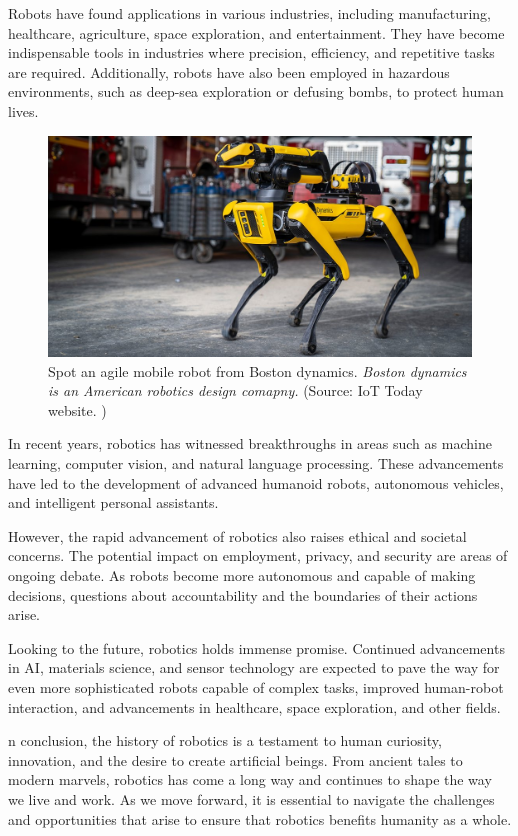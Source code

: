 Robots have found applications in various industries, including manufacturing, healthcare, agriculture, space exploration, and entertainment. They have become indispensable tools in industries where precision, efficiency, and repetitive tasks are required. Additionally, robots have also been employed in hazardous environments, such as deep-sea exploration or defusing bombs, to protect human lives.
\begin{figure}[H]
    \centering
    \includegraphics[scale=.45]{images/boston-dynamics-spot}
    \caption[Boston dynamics robot (spot)]{Spot an agile mobile robot from Boston dynamics. \textit{Boston dynamics is an American robotics design comapny.} (Source: IoT Today website. \cite{iotworldtoday})}
\end{figure}

In recent years, robotics has witnessed breakthroughs in areas such as machine learning, computer vision, and natural language processing. These advancements have led to the development of advanced humanoid robots, autonomous vehicles, and intelligent personal assistants.


However, the rapid advancement of robotics also raises ethical and societal concerns. The potential impact on employment, privacy, and security are areas of ongoing debate. As robots become more autonomous and capable of making decisions, questions about accountability and the boundaries of their actions arise.

Looking to the future, robotics holds immense promise. Continued advancements in AI, materials science, and sensor technology are expected to pave the way for even more sophisticated robots capable of complex tasks, improved human-robot interaction, and advancements in healthcare, space exploration, and other fields.

n conclusion, the history of robotics is a testament to human curiosity, innovation, and the desire to create artificial beings. From ancient tales to modern marvels, robotics has come a long way and continues to shape the way we live and work. As we move forward, it is essential to navigate the challenges and opportunities that arise to ensure that robotics benefits humanity as a whole.

